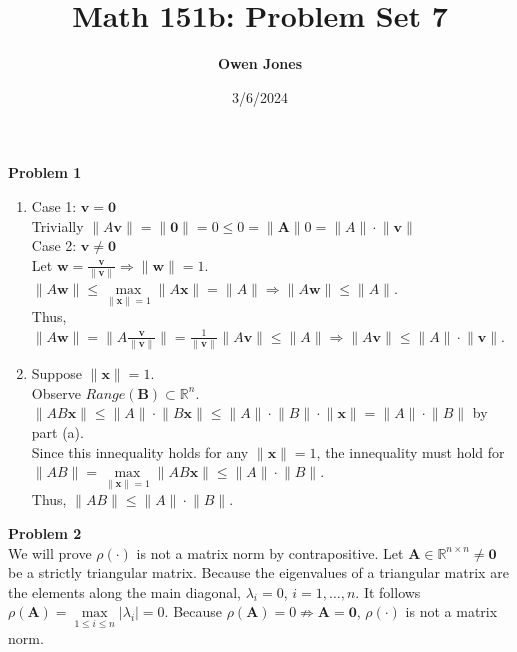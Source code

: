 \documentclass[10pt]{article}
\title{\bf Math 151b: Problem Set 7}
\date{3/6/2024}
\author{\bf Owen Jones}
\begin{document}
\maketitle

\noindent\textbf{Problem 1}\\
\begin{enumerate}[label=(\alph*)]
   \item Case 1: $\mathbf{v}=\mathbf{0}$\\
   Trivially $\lVert A\mathbf{v}\rVert=\lVert \mathbf{0}\rVert=0\le 0=\lVert\mathbf{A}\rVert 0=\lVert A\rVert \cdot\lVert\mathbf{v}\rVert$\\
   Case 2: $\mathbf{v}\neq\mathbf{0}$\\
   Let $\mathbf{w}=\frac{\mathbf{v}}{\lVert\mathbf{v}\rVert}\Rightarrow\lVert\mathbf{w}\rVert=1$.\\
   $\lVert A\mathbf{w}\rVert\le\underset{\lVert\mathbf{x}\rVert=1}{\max}\lVert A\mathbf{x}\rVert=\lVert A\rVert\Rightarrow \lVert A\mathbf{w}\rVert\le\lVert A\rVert$.\\
   Thus, $\lVert A\mathbf{w}\rVert=\lVert A\frac{\mathbf{v}}{\lVert\mathbf{v}\rVert}\rVert=\frac{1}{\lVert\mathbf{v}\rVert}\lVert A\mathbf{v}\rVert\le\lVert A\rVert\Rightarrow\lVert A\mathbf{v}\rVert\le\lVert A\rVert\cdot\lVert\mathbf{v}\rVert$.
   \item Suppose $\lVert \mathbf{x}\rVert=1$.\\
   Observe $Range(\mathbf{B})\subset\mathbb{R}^n$.\\
   $\lVert AB\mathbf{x}\rVert\le\lVert A\rVert\cdot\lVert B\mathbf{x}\rVert\le \lVert A\rVert\cdot\lVert B\rVert\cdot\lVert\mathbf{x}\rVert=\lVert A\rVert\cdot\lVert B\rVert$ by part (a).\\
   Since this innequality holds for any $\lVert \mathbf{x}\rVert=1$, the innequality must hold for $\lVert AB\rVert=\underset{\lVert \mathbf{x}\rVert=1}{\max}\lVert AB\mathbf{x}\rVert\le\lVert A\rVert\cdot\lVert B\rVert$.\\
   Thus, $\lVert AB\rVert\le\lVert A\rVert\cdot\lVert B\rVert$.
\end{enumerate}
\textbf{Problem 2}\\
We will prove $\rho(\cdot)$ is not a matrix norm by contrapositive. Let $\mathbf{A}\in\mathbb{R}^{n\times n}\neq\mathbf{0}$ be a strictly triangular matrix. 
Because the eigenvalues of a triangular matrix are the elements along the main diagonal, $\lambda_i=0$, $i=1,\ldots, n$.
It follows $\rho(\mathbf{A})=\underset{1\le i\le n}{\max}\lvert \lambda_i\rvert=0$.
Because $\rho(\mathbf{A})=0\not\Rightarrow \mathbf{A}=\mathbf{0}$, $\rho(\cdot)$ is not a matrix norm.\\
\end{document}
